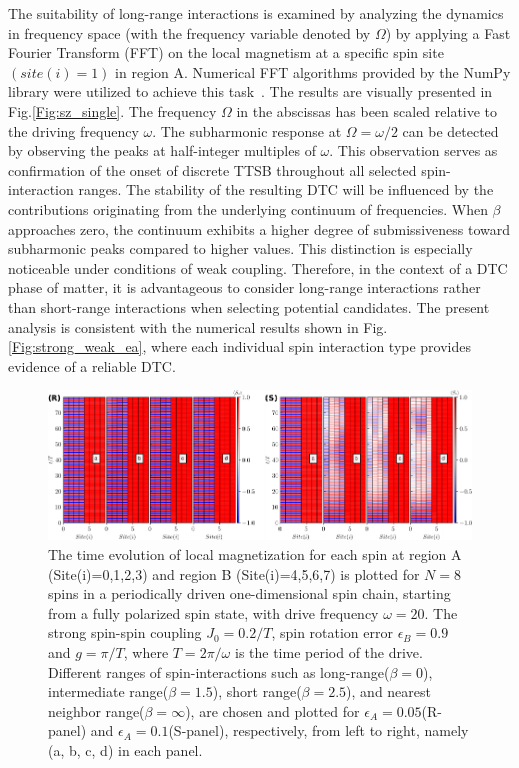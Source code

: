 \documentclass[12pt]{iopart}
\begin{document}
The suitability of long-range interactions is examined by analyzing the dynamics in frequency space (with the frequency variable denoted by $\Omega$) by applying a Fast Fourier Transform (FFT) on the local magnetism at a specific spin site $(site(i)=1)$ in region A. Numerical FFT algorithms provided by the NumPy library were utilized to achieve this task~\cite{harris2020array}. The results are visually presented in Fig.\ref{Fig:sz_single}.  The frequency $\Omega$ in the abscissas has been scaled relative to the driving frequency $\omega$. The subharmonic response at $\Omega=\omega/2$ can be detected by observing the peaks at half-integer multiples of $\omega$. This observation serves as confirmation of the onset of discrete TTSB throughout all selected spin-interaction ranges. The stability of the resulting DTC will be influenced by the contributions originating from the underlying continuum of frequencies. When $\beta$ approaches zero, the continuum exhibits a higher degree of submissiveness toward subharmonic peaks compared to higher values. This distinction is especially noticeable under conditions of weak coupling. Therefore, in the context of a DTC phase of matter, it is advantageous to consider long-range interactions rather than short-range interactions when selecting potential candidates. The present analysis is consistent with the numerical results shown in Fig.\ref{Fig:strong_weak_ea}, where each individual spin interaction type provides evidence of a reliable DTC.	
\begin{figure}[t!]
\centering
\includegraphics[width=15.cm]{EASJ_N_8.pdf}
\caption{The time evolution of local magnetization for each spin at region A (Site(i)=0,1,2,3) and region B (Site(i)=4,5,6,7) is plotted for $N=8$ spins in a periodically driven one-dimensional spin chain, starting from a fully polarized spin state, with drive frequency $\omega=20$. The strong spin-spin coupling $J_0 = 0.2/T$, spin rotation error $\epsilon_B = 0.9$ and $g=\pi/T$, where $T=2\pi/\omega$ is the time period of the drive.  Different ranges of spin-interactions such as long-range($\beta=0$), intermediate range($\beta=1.5$), short range($\beta=2.5$), and nearest neighbor range($\beta=\infty$), are chosen and plotted  for $\epsilon_A =0.05$(R-panel) and $\epsilon_A =0.1$(S-panel), respectively, from left to right, namely (a, b, c, d) in each panel.}
\label{Fig:ea}
\end{figure}
\end{document}
